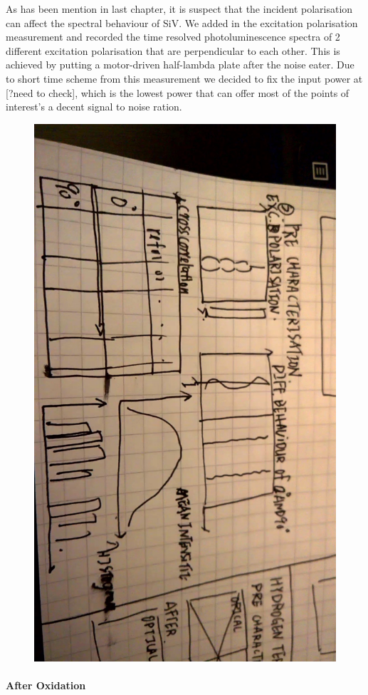 As has been mention in last chapter, it is suspect that the incident polarisation can affect the spectral behaviour of SiV. We added in the excitation polarisation measurement and recorded the time resolved photoluminescence spectra of 2 different excitation polarisation that are perpendicular to each other. This is achieved by putting a motor-driven half-lambda plate after the noise eater. 
Due to short time scheme from this measurement we decided to fix the input power at [?need to check], which is the lowest power that can offer most of the points of interest's a decent signal to noise ration.
\FloatBarrier
\begin{figure}[h]
\centering
\includegraphics[width=0.7\linewidth]{Figures/pic/WP_20160921_21_04_59_Moment}
\caption{}
\label{fig:wp20160921210459moment}
\end{figure}
\FloatBarrier



\paragraph{After Oxidation} 

